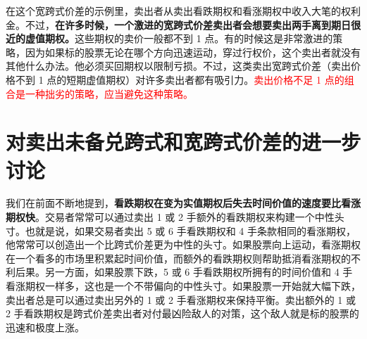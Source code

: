 在这个宽跨式价差的示例里，卖出者从卖出看跌期权和看涨期权中收入大笔的权利金。不过，\textbf{在许多时候，一个激进的宽跨式价差卖出者会想要卖出两手离到期日很近的虚值期权。}这些期权的卖价一般都不到 1 点。有的时候这是非常激进的策略，因为如果标的股票无论在哪个方向迅速运动，穿过行权价，这个卖出者就没有其他什么办法。他必须买回期权以限制亏损。不过，这类卖出宽跨式价差（卖出价格不到 1 点的短期虚值期权）对许多卖出者都有吸引力。\textcolor{red}{卖出价格不足 1 点的组合是一种拙劣的策略，应当避免这种策略。}
\section{对卖出未备兑跨式和宽跨式价差的进一步讨论}
我们在前面不断地提到，\textbf{看跌期权在变为实值期权后失去时间价值的速度要比看涨期权快}。交易者常常可以通过卖出 1 或 2 手额外的看跌期权来构建一个中性头寸。也就是说，如果交易者卖出 5 或 6 手看跌期权和 4 手条款相同的看涨期权，他常常可以创造出一个比跨式价差更为中性的头寸。如果股票向上运动，看涨期权在一个看多的市场里积累起时间价值，而额外的看跌期权则帮助抵消看涨期权的不利后果。另一方面，如果股票下跌，5 或 6 手看跌期权所拥有的时间价值和 4 手看涨期权一样多，这也是一个不带偏向的中性头寸。如果股票一开始就大幅下跌，卖出者总是可以通过卖出另外的 1 或 2 手看涨期权来保持平衡。卖出额外的 1 或 2 手看跌期权是跨式价差卖出者对付最凶险敌人的对策，这个敌人就是标的股票的迅速和极度上涨。